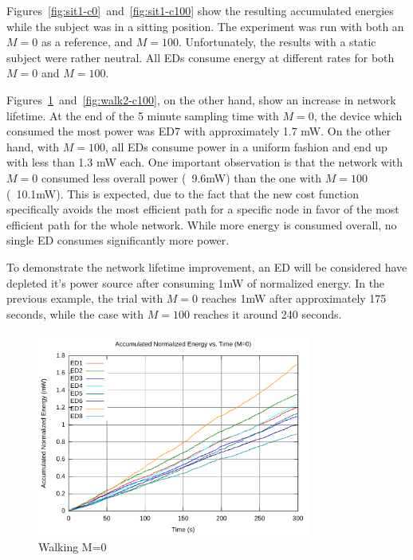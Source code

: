 \documentclass{article}
\begin{document}
Figures~\ref{fig:sit1-c0}~and~\ref{fig:sit1-c100} show the resulting accumulated energies while the subject was in a sitting position. The experiment was run with both an $M=0$ as a reference, and $M=100$. Unfortunately, the results with a static subject were rather neutral. All EDs consume energy at different rates for both $M=0$ and $M=100$.

Figures~\ref{fig:walk2-c0}~and~\ref{fig:walk2-c100}, on the other hand, show an increase in network lifetime. At the end of the 5 minute sampling time with $M=0$, the device which consumed the most power was ED7 with approximately 1.7 mW. On the other hand, with $M=100$, all EDs consume power in a uniform fashion and end up with less than 1.3 mW each. One important observation is that the network with $M=0$ consumed less overall power (~9.6mW) than the one with $M=100$ (~10.1mW). This is expected, due to the fact that the new cost function specifically avoids the most efficient path for a specific node in favor of the most efficient path for the whole network. While more energy is consumed overall, no single ED consumes significantly more power. 

To demonstrate the network lifetime improvement, an ED will be considered have depleted it's power source after consuming 1mW of normalized energy. In the previous example, the trial with $M=0$ reaches 1mW after approximately 175 seconds, while the case with $M=100$ reaches it around 240 seconds.

\begin{figure}[!ht]
\includegraphics[width=0.8\textwidth]{figures/walk2-c0.pdf}
\caption{Walking M=0}
\label{fig:walk2-c0}
\end{figure}
\end{document}
